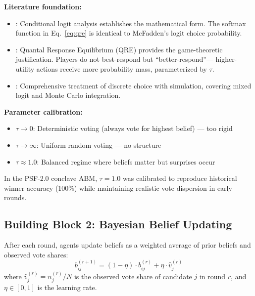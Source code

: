 \textbf{Literature foundation:}
\begin{itemize}[nosep]
\item \citet{mcfadden1974conditional}: Conditional logit analysis establishes the
      mathematical form. The softmax function in Eq.~\eqref{eq:qre} is identical
      to McFadden's logit choice probability.
\item \citet{mckelvey1995quantal}: Quantal Response Equilibrium (QRE) provides the
      game-theoretic justification. Players do not best-respond but ``better-respond''---
      higher-utility actions receive more probability mass, parameterized by $\tau$.
\item \citet{train2009discrete}: Comprehensive treatment of discrete choice with
      simulation, covering mixed logit and Monte Carlo integration.
\end{itemize}

\textbf{Parameter calibration:}
\begin{itemize}[nosep]
\item $\tau \to 0$: Deterministic voting (always vote for highest belief) --- too rigid
\item $\tau \to \infty$: Uniform random voting --- no structure
\item $\tau \approx 1.0$: Balanced regime where beliefs matter but surprises occur
\end{itemize}

In the PSF-2.0 conclave ABM, $\tau = 1.0$ was calibrated to reproduce historical
winner accuracy (100\%) while maintaining realistic vote dispersion in early rounds.


\subsection{Building Block 2: Bayesian Belief Updating}
\label{sec:bp-bayes}

\begin{tcolorbox}[colback=blue!3!white, colframe=blue!60!black, title=Axiom VTM-2: Belief Updating]
After each round, agents update beliefs as a weighted average of prior beliefs
and observed vote shares:
\begin{equation}
b_{ij}^{(r+1)} = (1 - \eta) \cdot b_{ij}^{(r)} + \eta \cdot \hat{v}_j^{(r)}
\label{eq:belief-update}
\end{equation}
where $\hat{v}_j^{(r)} = n_j^{(r)} / N$ is the observed vote share of candidate $j$
in round $r$, and $\eta \in [0,1]$ is the learning rate.
\end{tcolorbox}

